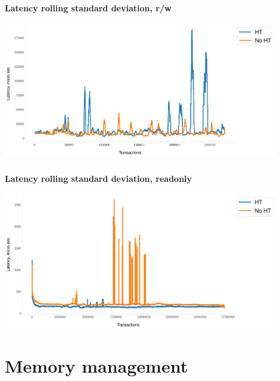 \documentclass[usenames,dvipsnames, 18pt, compress, aspectratio=169]{beamer}
\begin{document}
\begin{frame}
    \frametitle{}
    \begin{center}
    \textbf{Latency rolling standard deviation, r/w}

        \includegraphics[width=0.9\textwidth,center]{hyperthreading_2.png}

    \end{center}
\end{frame}

\begin{frame}
    \frametitle{}
    \begin{center}
    \textbf{Latency rolling standard deviation, readonly}

        \includegraphics[width=0.9\textwidth,center]{hyperthreading_readonly_2.png}

    \end{center}
\end{frame}

\fontsize{13pt}{14}\selectfont
\section{Memory management}
\fontsize{17pt}{18}\selectfont
\end{document}
